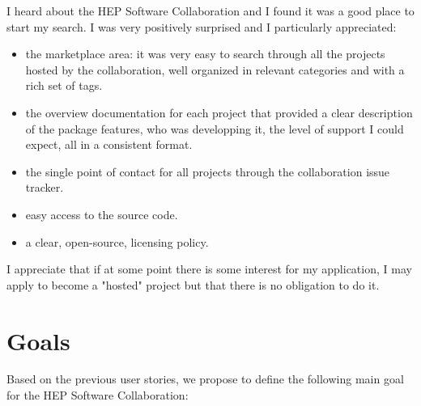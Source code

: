\documentclass[11pt]{article} %
\begin{document}
I heard about the HEP Software Collaboration and I found it was a good place to start my search.
I was very positively surprised and I particularly appreciated:
\begin{itemize}
\item the marketplace area: it was very easy to search through all the projects hosted by the collaboration, well organized
in relevant categories and with a rich set of tags.
\item the overview documentation for each project that provided a clear description of the package features, who was
developping it, the level of support I could expect, all in a consistent format.
\item the single point of contact for all projects through the collaboration issue tracker.
\item easy access to the source code.
\item a clear, open-source, licensing policy.
\end{itemize}

I appreciate that if at some point there is some interest for my application, I may apply to become a "hosted" project but that there is no obligation to do it.


\section{Goals}

Based on the previous user stories, we propose to define the following main goal for the HEP Software
Collaboration:
\end{document}
